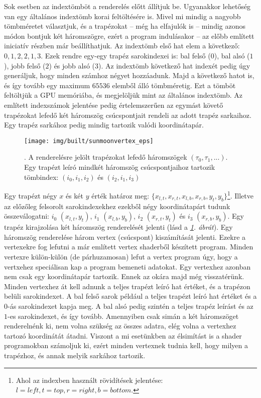 \documentclass[12pt]{report}
\theoremstyle{definition}
\begin{document}
Sok esetben az indextömböt a renderelés előtt állítjuk be. Ugyanakkor lehetőség
van egy általános indextömb korai feltöltésére is. Mivel mi mindig a nagyobb
tömbméretet választjuk, és a trapézokat -- még ha elfajulók is -- mindig azonos
módon bontjuk két háromszögre, ezért a program indulásakor -- az előbb említett
iniciatív részben már beállíthatjuk. Az indextömb első hat elem a következő:
$0, 1, 2, 2, 1, 3$. Ezek rendre egy-egy trapéz sarokindexei is: bal felső
($0$), bal alsó ($1$), jobb felső ($2$) és jobb alsó ($3$). Az indextömb
következő hat indexét pedig úgy generáljuk, hogy minden számhoz négyet
hozzáadunk. Majd a következő hatot is, és így tovább egy maximum $65536$
elemből álló tömbméretig. Ezt a tömböt feltöltjük a GPU memóriába, és
megjelöljük mint az általános indextömb. Az említett indexszámok jelentése
pedig értelemszerűen az egymást követő trapézokat lefedő két háromszög
csúcspontjait rendeli az adott trapéz sarkaihoz. Egy trapéz sarkához pedig
mindig tartozik valódi koordinátapár.

  \begin{figure}
    \centering
    \texttt{[image: img/built/sunmoonvertex\_eps]}
    \caption{\label{fig:sunmoonvertex}. A renderelésre jelölt trapézokat lefedő
    háromszögek $(\tau_0, \tau_1, ...)$. Egy trapézt leíró mindkét háromszög
    csúcspontjaihoz tartozik tömbindex: $(i_0, i_1, i_2)$ és $(i_2, i_1, i_3)$}
  \end{figure}

Egy trapézt négy $x$ és két $y$ érték határoz meg: $\{x_{l,t}, x_{r,t},
x_{l,b}, x_{r,b}, y_{t}, y_{b}\}$\footnote{Ahol az indexben használt
rövidítések jelentése: $l=left, t=top, r=right, b=bottom$.}. Illetve az
előzőleg felsorolt sarokindexekhez ezekből négy koordinátapárt tudunk
összeválogatni: $i_0$ $(x_{l,t}, y_{t})$, $i_1$ $(x_{l,b}, y_{b})$, $i_2$
$(x_{r,t}, y_{t})$ és $i_3$ $(x_{r,b}, y_{b})$. Egy trapéz kirajzolása két
háromszög renderelését jelenti (lásd a \emph{\ref{fig:sunmoonvertex}. ábrát}). Egy
háromszög renderelése három vertex (csúcspont) kiszámítását jelenti. Ezekre a
vertexekre fog lefutni a már említett vertex shaderből készített program.
Minden vertexre külön-külön (de párhuzamosan) lefut a vertex program úgy, hogy
a vertxehez speciálisan kap a program bemeneti adatokat. Egy vertexhez azonban
nem csak egy koordinátapár tartozik. Ennek az okára majd még visszatérünk.
Minden vertexhez át kell adnunk a teljes trapézt leíró hat értéket, és a
trapézon belüli sarokindexet. A bal felső sarok például a teljes trapézt leíró
hat értéket és a $0$-ás sarokindexet kapja meg. A bal alsó pedig szintén a
teljes trapéz leírást és az $1$-es sarokindexet, és így tovább. Amennyiben csak
simán a két háromszöget renderelnénk ki, nem volna szükség az összes adatra,
elég volna a vertexhez tartozó koordinátát átadni. Viszont a mi esetünkben az
élsimítást is a shader programokban számoljuk ki, ezért minden vertexnek tudnia
kell, hogy milyen a trapézhoz, és annak melyik sarkához tartozik.
\end{document}
